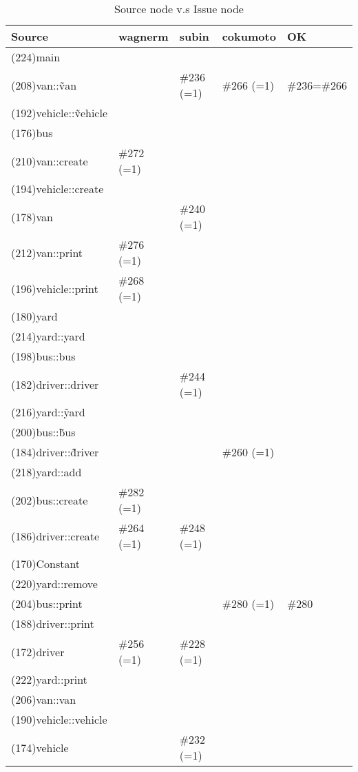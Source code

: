 \begin{table}[hb]
\begin{center}
\begin{tabular}{|l|l|l|l|l|}
\hline
Source & wagnerm & subin & cokumoto & OK\\
\hline
(224)main &  &  & & \\
(208)van::\~van &  & \#236 (=1) & \#266 (=1)& \#236=\#266 \\
(192)vehicle::\~vehicle &  &  & & \\
(176)bus &  &  & & \\
(210)van::create & \#272 (=1) &  & & \\
(194)vehicle::create &  &  & & \\
(178)van &  & \#240 (=1) & & \\
(212)van::print & \#276 (=1) &  & & \\
(196)vehicle::print & \#268 (=1) &  & & \\
(180)yard &  &  & & \\
(214)yard::yard &  &  & & \\
(198)bus::bus &  &  & & \\
(182)driver::driver &  & \#244 (=1) & & \\
(216)yard::\~yard &  &  & & \\
(200)bus::\~bus &  &  & & \\
(184)driver::\~driver &  &  & \#260 (=1)& \\
(218)yard::add &  &  & & \\
(202)bus::create & \#282 (=1) &  & & \\
(186)driver::create & \#264 (=1) & \#248 (=1) & & \\
(170)Constant &  &  & & \\
(220)yard::remove &  &  & & \\
(204)bus::print &  &  & \#280 (=1)& \#280\\
(188)driver::print &  &  & & \\
(172)driver & \#256 (=1) & \#228 (=1) & & \\
(222)yard::print &  &  & & \\
(206)van::van &  &  & & \\
(190)vehicle::vehicle &  &  & & \\
(174)vehicle &  & \#232 (=1) & & \\
\hline
\end{tabular}
\caption{Source node v.s Issue node}
\end{center}
\end{table}

